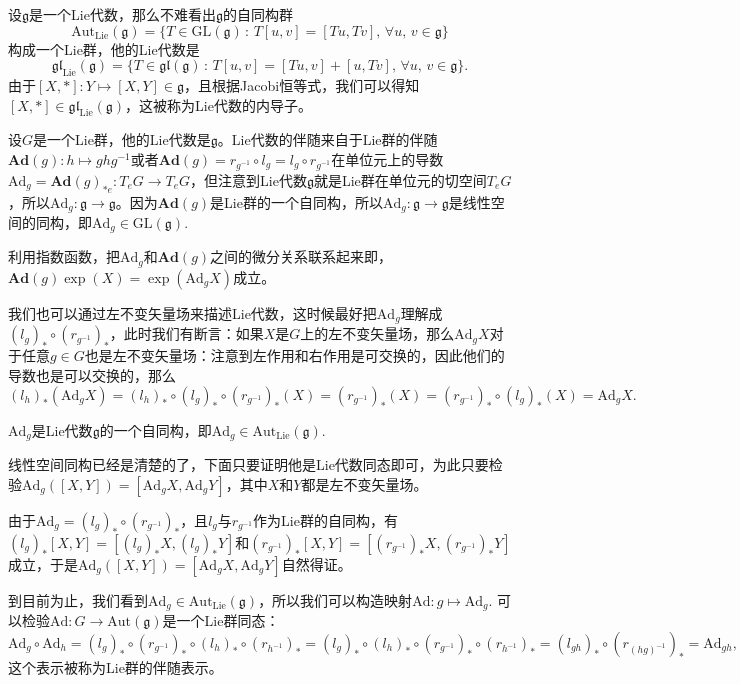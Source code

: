 \documentclass[9pt]{extarticle}
\newcommand{\lag}{{\mathfrak{g}}}
\begin{document}
\para 设$\lag$是一个Lie代数，那么不难看出$\lag$的自同构群
\[\mathrm{Aut}_{\mathrm{Lie}}(\lag)=\{T\in \mathrm{GL}(\lag)\,:\,T[u,v]=[Tu,Tv],\,\forall u,\,v\in\lag\}\]
构成一个Lie群，他的Lie代数是
\[\mathfrak{gl}_{\mathrm{Lie}}(\lag)=\{T\in \mathfrak{gl}(\lag)\,:\,T[u,v]=[Tu,v]+[u,Tv],\,\forall u,\,v\in\lag\}.\]
由于$[X,*]:Y\mapsto [X,Y]\in \lag$，且根据Jacobi恒等式，我们可以得知$[X,*]\in \mathfrak{gl}_{\mathrm{Lie}}(\lag)$，这被称为Lie代数的内导子。

\para 设$G$是一个Lie群，他的Lie代数是$\lag$。Lie代数的伴随来自于Lie群的伴随$\mathbf{Ad}(g):h\mapsto ghg^{-1}$或者$\mathbf{Ad}(g)=r_{g^{-1}}\circ l_g=l_g\circ r_{g^{-1}}$在单位元上的导数$\mathrm{Ad}_g=\mathbf{Ad}(g)_{*e}:T_eG\to T_eG$，但注意到Lie代数$\lag$就是Lie群在单位元的切空间$T_eG$，所以$\mathrm{Ad}_g:\lag\to \lag$。因为$\mathbf{Ad}(g)$是Lie群的一个自同构，所以$\mathrm{Ad}_g:\lag\to\lag$是线性空间的同构，即$\mathrm{Ad}_g\in \mathrm{GL}(\lag)$.

利用指数函数，把$\mathrm{Ad}_g$和$\mathbf{Ad}(g)$之间的微分关系联系起来即，$\mathbf{Ad}(g)\exp(X)=\exp(\mathrm{Ad}_gX)$成立。

\para 我们也可以通过左不变矢量场来描述Lie代数，这时候最好把$\mathrm{Ad}_g$理解成$(l_g)_*\circ (r_{g^{-1}})_*$，此时我们有断言：如果$X$是$G$上的左不变矢量场，那么$\mathrm{Ad}_gX$对于任意$g\in G$也是左不变矢量场：注意到左作用和右作用是可交换的，因此他们的导数也是可以交换的，那么
\[
	(l_h)_*(\mathrm{Ad}_gX)=(l_h)_*\circ (l_g)_*\circ (r_{g^{-1}})_*(X)=(r_{g^{-1}})_*(X)=(r_{g^{-1}})_*\circ (l_g)_*(X)=\mathrm{Ad}_gX.
\]

\para $\mathrm{Ad}_g$是Lie代数$\lag$的一个自同构，即$\mathrm{Ad}_g\in \mathrm{Aut}_{\mathrm{Lie}}(\lag)$.

线性空间同构已经是清楚的了，下面只要证明他是Lie代数同态即可，为此只要检验$\mathrm{Ad}_g([X,Y])=[\mathrm{Ad}_gX,\mathrm{Ad}_gY]$，其中$X$和$Y$都是左不变矢量场。

由于$\mathrm{Ad}_g=(l_g)_*\circ (r_{g^{-1}})_*$，且$l_g$与$r_{g^{-1}}$作为Lie群的自同构，有$(l_g)_*[X,Y]=[(l_g)_*X,(l_g)_*Y]$和$(r_{g^{-1}})_*[X,Y]=[(r_{g^{-1}})_*X,(r_{g^{-1}})_*Y]$成立，于是$\mathrm{Ad}_g([X,Y])=[\mathrm{Ad}_gX,\mathrm{Ad}_gY]$自然得证。

\para 到目前为止，我们看到$\mathrm{Ad}_g\in \mathrm{Aut}_{\mathrm{Lie}}(\lag)$，所以我们可以构造映射$\mathrm{Ad}:g\mapsto \mathrm{Ad}_g$. 可以检验$\mathrm{Ad}:G\to \mathrm{Aut}(\lag)$是一个Lie群同态：
\[\mathrm{Ad}_g\circ \mathrm{Ad}_h=(l_g)_*\circ (r_{g^{-1}})_*\circ (l_h)_*\circ (r_{h^{-1}})_*=(l_g)_*\circ (l_h)_*\circ (r_{g^{-1}})_*\circ (r_{h^{-1}})_*=(l_{gh})_*\circ (r_{(hg)^{-1}})_*=\mathrm{Ad}_{gh},\]
这个表示被称为Lie群的伴随表示。
\end{document}
